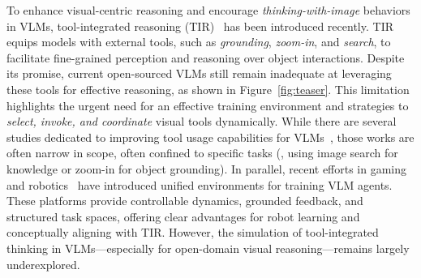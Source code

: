 To enhance visual-centric reasoning and encourage \emph{thinking-with-image} behaviors in VLMs, tool-integrated reasoning (TIR)~\citep{guo2025beyond,zheng2025deepeyes,xu2025incentivizing} has been introduced recently. TIR equips models with external tools, such as \emph{grounding}, \emph{zoom-in}, and \emph{search}, to facilitate fine-grained perception and reasoning over object interactions.
Despite its promise, current open-sourced VLMs still remain inadequate at leveraging these tools for effective reasoning, as shown in Figure~\ref{fig:teaser}.
This limitation highlights the urgent need for an effective training environment and strategies to \emph{select, invoke, and coordinate} visual tools dynamically. 
While there are several studies dedicated to improving tool usage capabilities for VLMs~\citep{wu2025mmsearchr1,zheng2025deepeyes,fan2025grit,su2025openthinkimg}, those works are often narrow in scope, often confined to specific tasks (\eg, using image search for knowledge or zoom-in for object grounding). 
In parallel, recent efforts in gaming and robotics~\citep{chen2025g1,wang2025vagen} have introduced unified environments for training VLM agents. These platforms provide controllable dynamics, grounded feedback, and structured task spaces, offering clear advantages for robot learning and conceptually aligning with TIR. 
However, the simulation of tool-integrated thinking in VLMs—especially for open-domain visual reasoning—remains largely underexplored.

